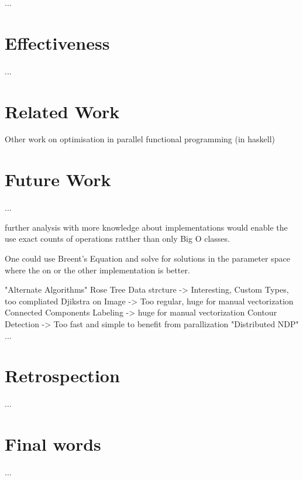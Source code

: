 

...
\section{Effectiveness}
  ...
\section{Related Work}
  Other work on optimisation in parallel functional programming (in haskell)
  
\section{Future Work}
  ...
  
  further analysis with more knowledge about implementations
  would enable the use exact counts of operations ratther than only Big O classes.
  
  One could use Breent's Equation and solve for
  solutions in the parameter space where the on or the other
  implementation is better.
  
  "Alternate Algorithms"
    Rose Tree Data strcture -> Interesting, Custom Types, too compliated
    Djikstra on Image -> Too regular, huge for manual vectorization
      Connected Components Labeling -> huge for manual vectorization
      Contour Detection -> Too fast and simple to benefit from parallization
  "Distributed NDP"
    ...
\section{Retrospection}
  ...
\section{Final words}
  ...
  
